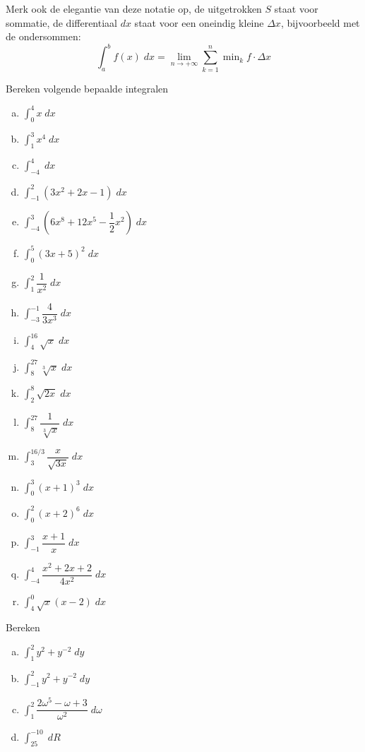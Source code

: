 \documentclass[a4paper,12pt]{article}
\begin{document}
Merk ook de elegantie van deze notatie op, de uitgetrokken $S$ staat voor sommatie, de differentiaal $dx$ staat voor een oneindig kleine $\Delta x$, bijvoorbeeld met de ondersommen:
$$\int_a^b f(x)\;dx = \lim_{n\to+\infty}\sum_{k=1}^n \min\nolimits_k f\cdot\Delta x$$


\begin{oefening}
Bereken volgende bepaalde integralen
\begin{multicols}{2}
\begin{enumerate}[(a)]
\itemsep1em
  \item $\displaystyle \int_0^4 x \;dx$
  \item $\displaystyle \int_1^3 x^4 \;dx$
  \item $\displaystyle \int_{-4}^4 \;dx$
  \item $\displaystyle \int_{-1}^2 (3x^2+2x-1)\;dx$
  \item $\displaystyle \int_{-4}^3 (6x^8+12x^5-\dfrac{1}{2}x^2)\;dx$
  \item $\displaystyle \int_{0}^5 (3x+5)^2\;dx$
  \item $\displaystyle \int_1^2 \dfrac{1}{x^2}\;dx$
  \item $\displaystyle \int_{-3}^{-1} \dfrac{4}{3x^3} \;dx$
  \item $\displaystyle \int_4^{16} \sqrt{x} \;dx$
  \item $\displaystyle \int_8^{27} \sqrt[3]{x} \;dx$
  \item $\displaystyle \int_2^8 \sqrt{2x} \;dx$
  \item $\displaystyle \int_8^{27} \dfrac{1}{\sqrt[3]{x}} \;dx$
  \item $\displaystyle \int_3^{16/3} \dfrac{x}{\sqrt{3x}} \;dx$
  \item $\displaystyle \int_{0}^3 (x+1)^3\;dx$
  \item $\displaystyle \int_{0}^2 (x+2)^6\;dx$
  \item $\displaystyle \int_{-1}^3 \dfrac{x+1}{x}\;dx$
  \item $\displaystyle \int_{-4}^4 \dfrac{x^2+2x+2}{4x^2}\;dx$
  \item $\displaystyle \int_{4}^0 \sqrt{x}(x-2)\;dx$
\end{enumerate}
\end{multicols}
\end{oefening}

\begin{oefening}
Bereken
\begin{multicols}{2}
\begin{enumerate}[(a)]
\itemsep1em
  \item $\displaystyle \int_1^2 y^2+y^{-2} \;dy$
  \item $\displaystyle \int_{-1}^2 y^2+y^{-2} \;dy$
  \item $\displaystyle \int_1^2 \dfrac{2\omega^5 - \omega + 3}{\omega^2} \;d\omega$
  \item $\displaystyle \int_{25}^{-10} \;dR$
\end{enumerate}
\end{multicols}
\end{oefening}
\end{document}

